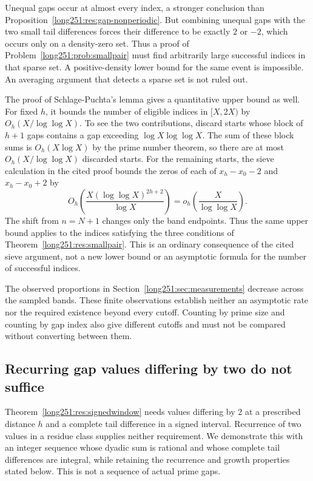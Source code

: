 Unequal gaps occur at almost every index, a stronger conclusion than
Proposition~\ref{long251:res:gap-nonperiodic}.  But combining unequal gaps
with the two small tail differences forces their difference to be exactly
$2$ or $-2$, which occurs only on a density-zero set.  Thus a proof of
Problem~\ref{long251:prob:smallpair} must find arbitrarily large successful
indices in that sparse set.  A positive-density lower bound for the same
event is impossible.  An averaging argument that detects a sparse set is
not ruled out.

The proof of Schlage-Puchta's lemma gives a quantitative upper bound as
well.  For fixed $h$, it bounds the number of eligible indices in
$[X,2X)$ by $O_h(X/\log\log X)$.  To see the two contributions, discard
starts whose block of $h+1$ gaps contains a gap exceeding
$\log X\log\log X$.  The sum of these block sums is $O_h(X\log X)$
by the prime number theorem, so there are at most
$O_h(X/\log\log X)$ discarded starts.  For the remaining starts, the
sieve calculation in the cited proof bounds the zeros of each of
$x_h-x_0-2$ and $x_h-x_0+2$ by
\[
 O_h\!\left(\frac{X(\log\log X)^{2h+2}}{\log X}\right)
 =o_h\!\left(\frac{X}{\log\log X}\right).
\]
The shift from $n=N+1$ changes only the band endpoints.  Thus the
same upper bound applies to the indices satisfying the three conditions
of Theorem~\ref{long251:res:smallpair}.  This is an ordinary
consequence of the cited sieve argument, not a new lower bound or an
asymptotic formula for the number of successful indices.

The observed proportions in Section~\ref{long251:sec:measurements} decrease
across the sampled bands.  These finite observations establish neither
an asymptotic rate nor the required existence beyond every cutoff.
Counting by prime size and counting by gap index also give different
cutoffs and must not be compared without converting between them.

\subsection{Recurring gap values differing by two do not suffice}

Theorem~\ref{long251:res:signedwindow} needs values differing by $2$
at a prescribed distance $h$ and a complete tail difference in a signed
interval.  Recurrence of two values in a residue class supplies neither
requirement.  We demonstrate this with an integer sequence whose dyadic
sum is rational and whose complete tail differences are integral,
while retaining the recurrence and growth properties stated below.
This is not a sequence of actual prime gaps.

